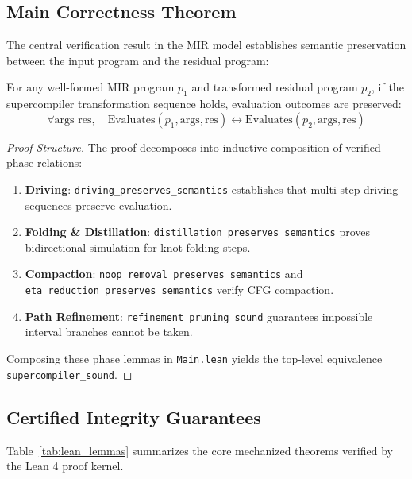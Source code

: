 \subsection{Main Correctness Theorem}
The central verification result in the MIR model establishes semantic preservation between the input program and the residual program:

\begin{theorem}
\label{thm:soundness}
For any well-formed MIR program $p_1$ and transformed residual program $p_2$, if the supercompiler transformation sequence holds, evaluation outcomes are preserved:
\begin{equation}
\forall \text{args } \text{res}, \quad \text{Evaluates}(p_1, \text{args}, \text{res}) \leftrightarrow \text{Evaluates}(p_2, \text{args}, \text{res})
\end{equation}
\end{theorem}

\begin{proof}[Proof Structure]
The proof decomposes into inductive composition of verified phase relations:
\begin{enumerate}
    \item \textbf{Driving}: \texttt{driving\_preserves\_semantics} establishes that multi-step driving sequences preserve evaluation.
    \item \textbf{Folding \& Distillation}: \texttt{distillation\_preserves\_semantics} proves bidirectional simulation for knot-folding steps.
    \item \textbf{Compaction}: \texttt{noop\_removal\_preserves\_semantics} and \texttt{eta\_reduction\_preserves\_semantics} verify CFG compaction.
    \item \textbf{Path Refinement}: \texttt{refinement\_pruning\_sound} guarantees impossible interval branches cannot be taken.
\end{enumerate}
Composing these phase lemmas in \texttt{Main.lean} yields the top-level equivalence \texttt{supercompiler\_sound}.
\end{proof}

\subsection{Certified Integrity Guarantees}
Table~\ref{tab:lean_lemmas} summarizes the core mechanized theorems verified by the Lean 4 proof kernel.

